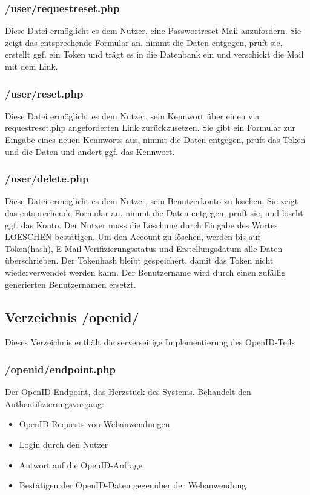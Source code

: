 \documentclass[parskip=half]{scrartcl}
\begin{document}
\subsubsection{/user/requestreset.php}
Diese Datei ermöglicht es dem Nutzer, eine Passwortreset-Mail anzufordern.
Sie zeigt das entsprechende Formular an, nimmt die Daten entgegen, prüft sie, erstellt ggf. ein Token und trägt es in die Datenbank ein und verschickt die Mail mit dem Link.

\subsubsection{/user/reset.php}
Diese Datei ermöglicht es dem Nutzer, sein Kennwort über einen via requestreset.php angeforderten Link zurückzusetzen.
Sie gibt ein Formular zur Eingabe eines neuen Kennworts aus, nimmt die Daten entgegen, prüft das Token und die Daten und ändert ggf. das Kennwort.

\subsubsection{/user/delete.php}
Diese Datei ermöglicht es dem Nutzer, sein Benutzerkonto zu löschen.
Sie zeigt das entsprechende Formular an, nimmt die Daten entgegen, prüft sie, und löscht ggf. das Konto.
Der Nutzer muss die Löschung durch Eingabe des Wortes LOESCHEN bestätigen.
Um den Account zu löschen, werden bis auf Token(hash), E-Mail-Verifizierungsstatus und Erstellungsdatum alle Daten überschrieben.
Der Tokenhash bleibt gespeichert, damit das Token nicht wiederverwendet werden kann.
Der Benutzername wird durch einen zufällig generierten Benutzernamen ersetzt.

\subsection{Verzeichnis /openid/}
Dieses Verzeichnis enthält die serverseitige Implementierung des OpenID-Teils

\subsubsection{/openid/endpoint.php}
Der OpenID-Endpoint, das Herzstück des Systems.
Behandelt den Authentifizierungsvorgang:

\begin{itemize}
	\item OpenID-Requests von Webanwendungen
	\item Login durch den Nutzer
	\item Antwort auf die OpenID-Anfrage
	\item Bestätigen der OpenID-Daten gegenüber der Webanwendung
\end{itemize}
\end{document}
